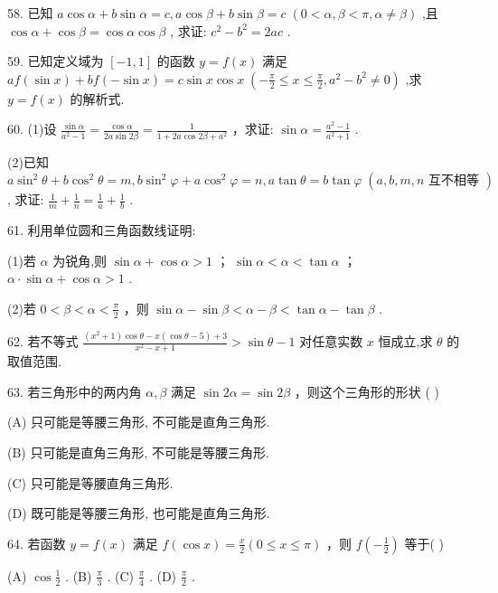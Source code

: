 \documentclass[10pt]{article}
\newcommand*\circled[1]{\tikz[baseline=(char.base)]{\node[shape=circle,draw,inner sep=1.5pt] (char) {\small #1};}}
\begin{document}
58. 已知 \(a\cos \alpha  + b\sin \alpha  = c,a\cos \beta  + b\sin \beta  = c\;\left( {0 < \alpha ,\beta  < \pi ,\alpha  \neq  \beta }\right)\) ,且 \(\cos \alpha  + \cos \beta  = \cos \alpha \cos \beta\) , 求证: \({c}^{2} - {b}^{2} = {2ac}\) .

59. 已知定义域为 \(\left\lbrack  {-1,1}\right\rbrack\) 的函数 \(y = f\left( x\right)\) 满足 \({af}\left( {\sin x}\right)  + {bf}\left( {-\sin x}\right)  = c\sin x\cos x \; \left( {-\frac{\pi }{2} \leq  x \leq  \frac{\pi }{2},{a}^{2} - {b}^{2} \neq  0}\right)\) ,求 \(y = f\left( x\right)\) 的解析式.

60. (1)设 \(\frac{\sin \alpha }{{a}^{2} - 1} = \frac{\cos \alpha }{{2a}\sin {2\beta }} = \frac{1}{1 + {2a}\cos {2\beta } + {a}^{2}}\) ，求证: \(\sin \alpha  = \frac{{a}^{2} - 1}{{a}^{2} + 1}\) .

(2)已知 \(a{\sin }^{2}\theta  + b{\cos }^{2}\theta  = m,b{\sin }^{2}\varphi  + a{\cos }^{2}\varphi  = n,a\tan \theta  = b\tan \varphi \;\left( {a,b,m,n\text{ 互不相等 }}\right)\) , 求证: \(\frac{1}{m} + \frac{1}{n} = \frac{1}{a} + \frac{1}{b}\) .

61. 利用单位圆和三角函数线证明:

(1)若 \(\alpha\) 为锐角,则 \circled{1}  \(\sin \alpha  + \cos \alpha  > 1\) ； \circled{2}  \(\sin \alpha  < \alpha  < \tan \alpha\) ； \circled{3}  \(\alpha  \cdot  \sin \alpha  + \cos \alpha  > 1\) .

(2)若 \(0 < \beta  < \alpha  < \frac{\pi }{2}\) ，则 \(\sin \alpha  - \sin \beta  < \alpha  - \beta  < \tan \alpha  - \tan \beta\) .

62. 若不等式 \(\frac{\left( {{x}^{2} + 1}\right) \cos \theta  - x\left( {\cos \theta  - 5}\right)  + 3}{{x}^{2} - x + 1} > \sin \theta  - 1\) 对任意实数 \(x\) 恒成立,求 \(\theta\) 的取值范围.

63. 若三角形中的两内角 \(\alpha ,\beta\) 满足 \(\sin {2\alpha } = \sin {2\beta }\) ，则这个三角形的形状 ( )

(A) 只可能是等腰三角形, 不可能是直角三角形.

(B) 只可能是直角三角形, 不可能是等腰三角形.

(C) 只可能是等腰直角三角形.

(D) 既可能是等腰三角形, 也可能是直角三角形.

64. 若函数 \(y = f\left( x\right)\) 满足 \(f\left( {\cos x}\right)  = \frac{x}{2}\left( {0 \leq  x \leq  \pi }\right)\) ，则 \(f\left( {-\frac{1}{2}}\right)\) 等于( )

(A) \(\cos \frac{1}{2}\) . (B) \(\frac{\pi }{3}\) . (C) \(\frac{\pi }{4}\) . (D) \(\frac{\pi }{2}\) .
\end{document}
